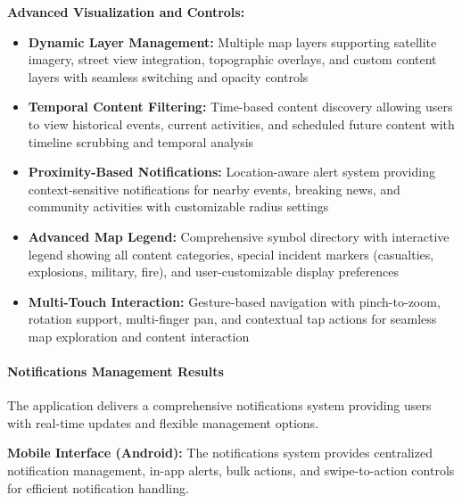 \textbf{Advanced Visualization and Controls:}
\begin{itemize}
    \item \textbf{Dynamic Layer Management:} Multiple map layers supporting satellite imagery, street view integration, topographic overlays, and custom content layers with seamless switching and opacity controls
    \item \textbf{Temporal Content Filtering:} Time-based content discovery allowing users to view historical events, current activities, and scheduled future content with timeline scrubbing and temporal analysis
    \item \textbf{Proximity-Based Notifications:} Location-aware alert system providing context-sensitive notifications for nearby events, breaking news, and community activities with customizable radius settings
    \item \textbf{Advanced Map Legend:} Comprehensive symbol directory with interactive legend showing all content categories, special incident markers (casualties, explosions, military, fire), and user-customizable display preferences
    \item \textbf{Multi-Touch Interaction:} Gesture-based navigation with pinch-to-zoom, rotation support, multi-finger pan, and contextual tap actions for seamless map exploration and content interaction
\end{itemize}

\clearpage

\paragraph{Notifications Management Results}
The application delivers a comprehensive notifications system providing users with real-time updates and flexible management options.

\textbf{Mobile Interface (Android):}
The notifications system provides centralized notification management, in-app alerts, bulk actions, and swipe-to-action controls for efficient notification handling.

